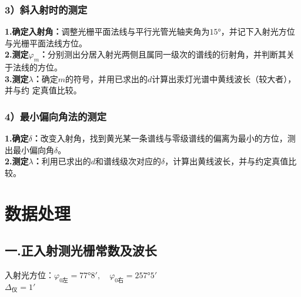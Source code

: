 \documentclass{ctexart}
\begin{document}
\subsubsection*{3）斜入射时的测定}
\noindent \textbf{1.确定入射角：}调整光栅平面法线与平行光管光轴夹角为$15°$，并记下入射光方位与光栅平面法线方位。\\
\noindent \textbf{2.测定$\varphi_m$：}分别测出分居入射光两侧且属同一级次的谱线的衍射角，并判断其关于法线的方位。\\
\noindent \textbf{3.测定$\lambda$：}确定$m$的符号，并用已求出的$d$计算出汞灯光谱中黄线波长（较大者），并与约
定真值比较。
\subsubsection*{4）最小偏向角法的测定}
\noindent \textbf{1.确定$\delta$：}改变入射角，找到黄光某一条谱线与零级谱线的偏离为最小的方位，测出最小偏向角$\delta$。\\
\noindent \textbf{2.测定$\lambda$：}利用已求出的$d$和谱线级次对应的$\delta$，计算出黄线波长，并与约定真值比较。

\clearpage
\section{数据处理}

\subsection*{一.正入射测光栅常数及波长}
\noindent 入射光方位：$\varphi_{0\text{左}}=77°8',\quad \varphi_{0\text{右}}=257°5'$\\
\noindent $\Delta_{\text{仪}}=1'$
\end{document}

